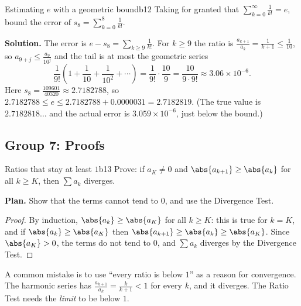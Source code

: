 \documentclass[11pt]{article}
\begin{document}
\begin{exmp}{Estimating $e$ with a geometric bound}{b12}
Taking for granted that $\sum_{k=0}^\infty\frac1{k!}=e$, bound the error of $s_8=\sum_{k=0}^8\frac1{k!}$.

\textbf{Solution.} The error is $e-s_8=\sum_{k\ge9}\frac1{k!}$. For $k\ge9$ the ratio is $\frac{a_{k+1}}{a_k}=\frac1{k+1}\le\frac1{10}$, so $a_{9+j}\le\frac{a_9}{10^j}$ and the tail is at most the geometric series
\[
\frac1{9!}\left(1+\frac1{10}+\frac1{10^2}+\cdots\right)=\frac1{9!}\cdot\frac{10}9=\frac{10}{9\cdot9!}\approx3.06\times10^{-6}.
\]
Here $s_8=\frac{109601}{40320}\approx2.7182788$, so $2.7182788\le e\le2.7182788+0.0000031=2.7182819$. (The true value is $2.7182818\ldots$ and the actual error is $3.059\times10^{-6}$, just below the bound.)
\end{exmp}

\subsection*{Group 7: Proofs}

\begin{exmp}{Ratios that stay at least $1$}{b13}
Prove: if $a_K\ne0$ and $\abs{a_{k+1}}\ge\abs{a_k}$ for all $k\ge K$, then $\sum a_k$ diverges.

\textbf{Plan.} Show that the terms cannot tend to $0$, and use the Divergence Test.

\begin{proof}
By induction, $\abs{a_k}\ge\abs{a_K}$ for all $k\ge K$: this is true for $k=K$, and if $\abs{a_k}\ge\abs{a_K}$ then $\abs{a_{k+1}}\ge\abs{a_k}\ge\abs{a_K}$. Since $\abs{a_K}>0$, the terms do not tend to $0$, and $\sum a_k$ diverges by the Divergence Test.
\end{proof}
A common mistake is to use ``every ratio is below $1$'' as a reason for convergence. The harmonic series has $\frac{a_{k+1}}{a_k}=\frac k{k+1}<1$ for every $k$, and it diverges. The Ratio Test needs the \emph{limit} to be below $1$.
\end{exmp}
\end{document}
